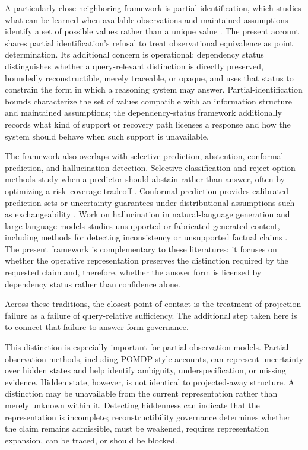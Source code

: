 \documentclass[11pt]{article}
\begin{document}
A particularly close neighboring framework is partial identification, which studies what can be learned when available observations and maintained assumptions identify a set of possible values rather than a unique value \cite{Manski2003,Manski2007}. The present account shares partial identification's refusal to treat observational equivalence as point determination. Its additional concern is operational: dependency status distinguishes whether a query-relevant distinction is directly preserved, boundedly reconstructible, merely traceable, or opaque, and uses that status to constrain the form in which a reasoning system may answer. Partial-identification bounds characterize the set of values compatible with an information structure and maintained assumptions; the dependency-status framework additionally records what kind of support or recovery path licenses a response and how the system should behave when such support is unavailable.

The framework also overlaps with selective prediction, abstention, conformal prediction, and hallucination detection. Selective classification and reject-option methods study when a predictor should abstain rather than answer, often by optimizing a risk--coverage tradeoff \cite{Geifman2017,Geifman2019}. Conformal prediction provides calibrated prediction sets or uncertainty guarantees under distributional assumptions such as exchangeability \cite{Vovk2005,Shafer2008}. Work on hallucination in natural-language generation and large language models studies unsupported or fabricated generated content, including methods for detecting inconsistency or unsupported factual claims \cite{Ji2023,Manakul2023}. The present framework is complementary to these literatures: it focuses on whether the operative representation preserves the distinction required by the requested claim and, therefore, whether the answer form is licensed by dependency status rather than confidence alone.

Across these traditions, the closest point of contact is the treatment of projection failure as a failure of query-relative sufficiency. The additional step taken here is to connect that failure to answer-form governance.

This distinction is especially important for partial-observation models. Partial-observation methods, including POMDP-style accounts, can represent uncertainty over hidden states and help identify ambiguity, underspecification, or missing evidence. Hidden state, however, is not identical to projected-away structure. A distinction may be unavailable from the current representation rather than merely unknown within it. Detecting hiddenness can indicate that the representation is incomplete; reconstructibility governance determines whether the claim remains admissible, must be weakened, requires representation expansion, can be traced, or should be blocked.
\end{document}
